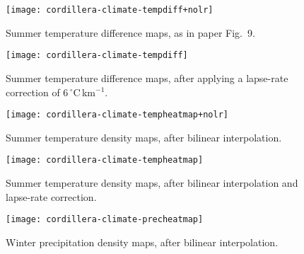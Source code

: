 \documentclass[10pt]{article}
\begin{document}

\clearpage

\begin{figure}
    \centering
    \texttt{[image: cordillera-climate-tempdiff+nolr]}
    \caption{Summer temperature difference maps, as in paper Fig.~9.}
\end{figure}

\begin{figure}
    \centering
    \texttt{[image: cordillera-climate-tempdiff]}
    \caption{Summer temperature difference maps, after applying a lapse-rate correction of 6\,{$^\circ$}C\,km$^{-1}$.}
\end{figure}

\begin{figure}
    \centering
    \caption{Summer temperature density maps, after bilinear interpolation.}
    \texttt{[image: cordillera-climate-tempheatmap+nolr]}
\end{figure}

\begin{figure}
    \centering
    \texttt{[image: cordillera-climate-tempheatmap]}
    \caption{Summer temperature density maps, after bilinear interpolation and lapse-rate correction.}
\end{figure}

\begin{figure}
    \centering
    \texttt{[image: cordillera-climate-precheatmap]}
    \caption{Winter precipitation density maps, after bilinear interpolation.}
\end{figure}
\end{document}
